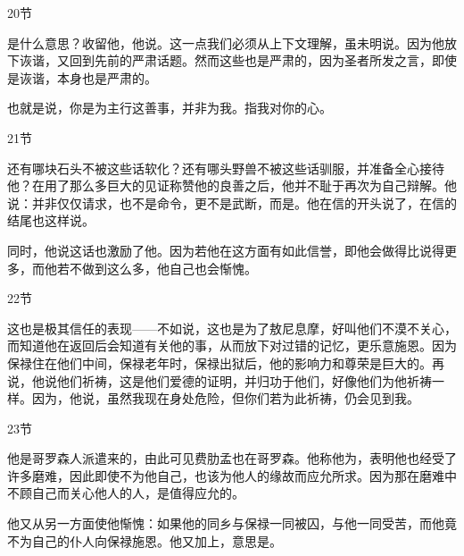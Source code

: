 20节  \par

是什么意思？收留他，他说。这一点我们必须从上下文理解，虽未明说。因为他放下诙谐，又回到先前的严肃话题。然而这些也是严肃的，因为圣者所发之言，即使是诙谐，本身也是严肃的。\par

\par

也就是说，你是为主行这善事，并非为我。指我对你的心。\par

21节  \par

还有哪块石头不被这些话软化？还有哪头野兽不被这些话驯服，并准备全心接待他？在用了那么多巨大的见证称赞他的良善之后，他并不耻于再次为自己辩解。他说：并非仅仅请求，也不是命令，更不是武断，而是。他在信的开头说了，在信的结尾也这样说。\par

\par

同时，他说这话也激励了他。因为若他在这方面有如此信誉，即他会做得比说得更多，而他若不做到这么多，他自己也会惭愧。\par

22节  \par

这也是极其信任的表现——不如说，这也是为了敖尼息摩，好叫他们不漠不关心，而知道他在返回后会知道有关他的事，从而放下对过错的记忆，更乐意施恩。因为保禄住在他们中间，保禄老年时，保禄出狱后，他的影响力和尊荣是巨大的。再说，他说他们祈祷，这是他们爱德的证明，并归功于他们，好像他们为他祈祷一样。因为，他说，虽然我现在身处危险，但你们若为此祈祷，仍会见到我。\par

23节  \par

他是哥罗森人派遣来的，由此可见费肋孟也在哥罗森。他称他为，表明他也经受了许多磨难，因此即使不为他自己，也该为他人的缘故而应允所求。因为那在磨难中不顾自己而关心他人的人，是值得应允的。\par

他又从另一方面使他惭愧：如果他的同乡与保禄一同被囚，与他一同受苦，而他竟不为自己的仆人向保禄施恩。他又加上，意思是。\par

